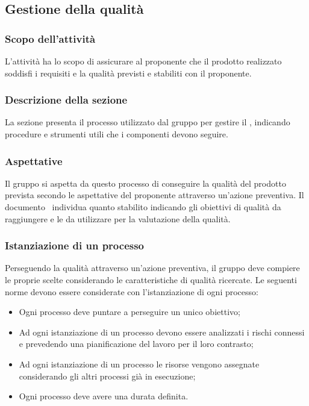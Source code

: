\subsection{Gestione della qualità}
\subsubsection{Scopo dell'attività} \label{PSup_GestioneQualità_Scopo}
L'attività ha lo scopo di assicurare al proponente che il prodotto realizzato soddisfi i requisiti e la qualità previsti e stabiliti con il proponente.
\subsubsection{Descrizione della sezione} 
La sezione presenta il processo utilizzato dal gruppo per gestire il , indicando procedure e strumenti utili che i componenti devono seguire.
\subsubsection{Aspettative}
Il gruppo si aspetta da questo processo di conseguire la qualità del prodotto prevista secondo le aspettative del proponente attraverso un'azione preventiva. Il documento \PdQv\ individua quanto stabilito indicando gli obiettivi di qualità da raggiungere e le  da utilizzare per la valutazione della qualità.
\subsubsection{Istanziazione di un processo}
Perseguendo la qualità attraverso un'azione preventiva, il gruppo deve compiere le proprie scelte considerando le caratteristiche di qualità ricercate. 
Le seguenti norme devono essere considerate con l'istanziazione di ogni processo:
\begin{itemize}
	\item Ogni processo deve puntare a perseguire un unico obiettivo;
	\item Ad ogni istanziazione di un processo devono essere analizzati i rischi connessi e prevedendo una pianificazione del lavoro per il loro contrasto;
	\item Ad ogni istanziazione di un processo le risorse vengono assegnate considerando gli altri processi già in esecuzione;
	\item Ogni processo deve avere una durata definita.
\end{itemize}
